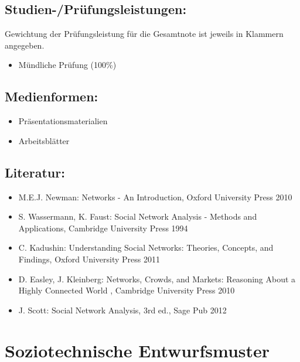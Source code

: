 \section*{Studien-/Prüfungsleistungen:}\label{studien-pruxfcfungsleistungen-11}

Gewichtung der Prüfungsleistung für die Gesamtnote ist jeweils in
Klammern angegeben.

\begin{itemize}
\tightlist
\item
  Mündliche Prüfung (100\%)
\end{itemize}

\section*{Medienformen:}\label{medienformen-11}

\begin{itemize}
\tightlist
\item
  Präsentationsmaterialien
\item
  Arbeitsblätter
\end{itemize}

\section*{Literatur:}\label{literatur-11}

\begin{itemize}
\tightlist
\item
  M.E.J. Newman: Networks - An Introduction, Oxford University Press
  2010
\item
  S. Wassermann, K. Faust: Social Network Analysis - Methods and
  Applications, Cambridge University Press 1994
\item
  C. Kadushin: Understanding Social Networks: Theories, Concepts, and
  Findings, Oxford University Press 2011
\item
  D. Easley, J. Kleinberg: Networks, Crowds, and Markets: Reasoning
  About a Highly Connected World , Cambridge University Press 2010
\item
  J. Scott: Social Network Analysis, 3rd ed., Sage Pub 2012
\end{itemize}

\chapter{Soziotechnische
Entwurfsmuster}\label{soziotechnische-entwurfsmuster}

